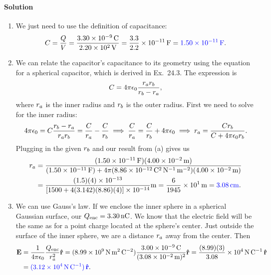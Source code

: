 \documentclass[11pt]{article}
\newcommand{\beq}{\begin{equation*}}
\newcommand{\eeq}{\end{equation*}}
\newenvironment{solution}
{
    \paragraph{Solution}
    \ignorespaces
}
{
    \bigskip
}
\begin{document}
\begin{solution}
	\begin{enumerate}
		\item We just need to use the definition of capacitance:
		\beq
			C = \frac{Q}{V}
			= \frac{\SI{3.30e-9}{\coulomb}}{\SI{2.20e2}{\volt}}
			= \frac{3.3}{2.2} \times \SI{e-11}{\farad}
			= {\color{blue} \SI{1.50e-11}{\farad}}.
		\eeq
		
		\item We can relate the capacitor's capacitance to its geometry using the equation for a spherical capacitor, which is derived in Ex.~24.3.  The expression is
		\beq
			C = 4\pi\ent \frac{\ra \rb}{\rb - \ra},
		\eeq
		where $r_a$ is the inner radius and $r_b$ is the outer radius.  First we need to solve for the inner radius:
		\beq
			4\pi\ent = C \frac{\rb - \ra}{\ra\rb} = \frac{C}{\ra} - \frac{C}{\rb}
			\implies \frac{C}{\ra} = \frac{C}{\rb} + 4\pi\ent
			\implies \ra = \frac{C \rb}{C + 4\pi\ent \rb}.
		\eeq
		Plugging in the given $r_b$ and our result from (a) gives us
		\begin{align*}
			\ra &= \frac{(\SI{1.50e-11}{\farad}) (\SI{4.00e-2}{\meter})}{(\SI{1.50e-11}{\farad}) + 4\pi (\SI{8.86e-12}{\square\coulomb\per\newton\per\square\meter}) (\SI{4.00e-2}{\meter})} \\
			&= \frac{(1.5)(4) \times \num{e-13}}{[1500 + 4 (3.142) (8.86) (4)] \times \num{e-14}} \si{\meter}
			= \frac{6}{1945} \times \SI{e1}{\meter}
			= {\color{blue} \SI{3.08}{\cm}}.
		\end{align*}
		
		\item We can use Gauss's law.  If we enclose the inner sphere in a spherical Gaussian surface, our $Q_\text{enc} = \SI{3.30}{\nano\coulomb}$.  We know that the electric field will be the same as for a point charge located at the sphere's center.  Just outside the surface of the inner sphere, we are a distance $r_a$ away from the center.  Then
		\begin{align*}
			\mathbf{E} &= \frac{1}{4\pi\epsilon_0} \frac{Q_\text{enc}}{r_a^2} \mathbf{\hat{r}}
			= (\SI{8.99e9}{\newton\square\meter\per\square\coulomb}) \frac{\SI{3.00e-9}{\coulomb}}{(\SI{3.08e-2}{\meter})^2} \mathbf{\hat{r}}
			= \frac{(8.99)(3)}{3.08} \times \SI{e4}{\newton\per\coulomb} \, \mathbf{\hat{r}} \\
			&= {\color{blue} (\SI{3.12e4}{\newton\per\coulomb}) \,\mathbf{\hat{r}}}.
		\end{align*}
	\end{enumerate}
\end{solution}
\end{document}
